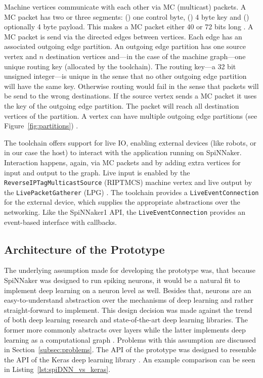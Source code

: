 \documentclass[]{article}
\begin{document}
Machine vertices communicate with each other via MC (multicast)
packets.
A MC packet has two or three segments:
() one control byte, () 4 byte key
and () optionally 4 byte payload.
This makes a MC packet either 40 or 72 bits long
\citep{furber_et_al_2020}.
A MC packet is send via the directed edges between vertices.
Each edge has an associated outgoing edge partition.
An outgoing edge partition has one source vertex and $n$ destination
vertices and---in the case of the machine graph---one unique
routing key (allocated by the toolchain).
The routing key---a 32 bit unsigned integer---is unique in the sense
that no other outgoing edge partition will have the same key.
Otherwise routing would fail in the sense that packets will be send
to the wrong destinations.
If the source vertex sends a MC packet it uses the key of the
outgoing edge partition.
The packet will reach all destination vertices of the partition.
A vertex can have multiple outgoing edge partitions
(see Figure~\ref{fig:partitions}) \citep{furber_et_al_2020}.

The toolchain offers support for live IO, enabling external devices
(like robots, or in our case the host) to interact with the
application running on SpiNNaker.
Interaction happens, again, via MC packets and by adding extra
vertices for input and output to the graph.
Live input is enabled by the \texttt{ReverseIPTagMulticastSource}
(RIPTMCS) machine vertex and live output by the
\texttt{LivePacketGatherer} (LPG) \citep{furber_et_al_2020}.
The toolchain provides a \texttt{LiveEventCon\-nection} for the
external device, which supplies the appropriate abstractions over the
networking.
Like the SpiNNaker1 API, the \texttt{Live\-Event\-Con\-nection}
provides an event-based interface with callbacks.



\subsection{Architecture of the Prototype} %
\label{subsec:SpiDNN_arch}

The underlying assumption made for developing the prototype was,
that because SpiNNaker was designed to run spiking neurons, it would
be a natural fit to implement deep learning on a neuron level as well.
Besides that, neurons are an easy-to-understand abstraction over the
mechanisms of deep learning and rather straight-forward to implement.
This design decision was made against the trend of both deep learning
research and state-of-the-art deep learning libraries.
The former more commonly abstracts over layers while the latter
implements deep learning as a computational graph
\citep{goodfellow_et_al_2016}.
Problems with this assumption are discussed in
Section~\ref{subsec:problems}.
The API of the prototype was designed to resemble the API of the Keras
deep learning library \citep{keras}.
An example comparison can be seen in
Listing~\ref{lst:spiDNN_vs_keras}.
\end{document}
